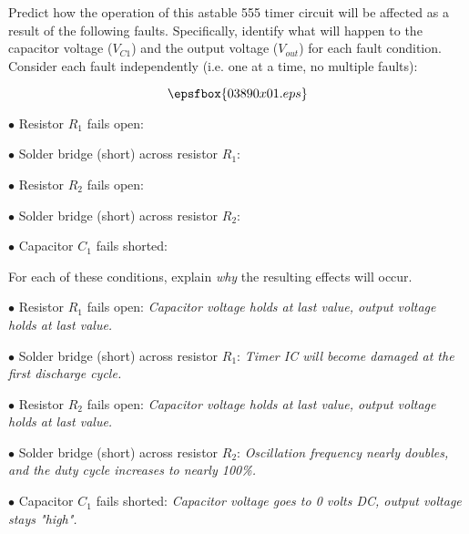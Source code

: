 

Predict how the operation of this astable 555 timer circuit will be affected as a result of the following faults.  Specifically, identify what will happen to the capacitor voltage ($V_{C1}$) and the output voltage ($V_{out}$) for each fault condition.  Consider each fault independently (i.e. one at a time, no multiple faults):

$$\epsfbox{03890x01.eps}$$

\medskip
\item{$\bullet$} Resistor $R_1$ fails open:
\vskip 5pt
\item{$\bullet$} Solder bridge (short) across resistor $R_1$:
\vskip 5pt
\item{$\bullet$} Resistor $R_2$ fails open:
\vskip 5pt
\item{$\bullet$} Solder bridge (short) across resistor $R_2$:
\vskip 5pt
\item{$\bullet$} Capacitor $C_1$ fails shorted:
\medskip

For each of these conditions, explain {\it why} the resulting effects will occur.







\medskip
\item{$\bullet$} Resistor $R_1$ fails open: {\it Capacitor voltage holds at last value, output voltage holds at last value.}
\vskip 5pt
\item{$\bullet$} Solder bridge (short) across resistor $R_1$: {\it Timer IC will become damaged at the first discharge cycle.}
\vskip 5pt
\item{$\bullet$} Resistor $R_2$ fails open: {\it Capacitor voltage holds at last value, output voltage holds at last value.}
\vskip 5pt
\item{$\bullet$} Solder bridge (short) across resistor $R_2$: {\it Oscillation frequency nearly doubles, and the duty cycle increases to nearly 100\%.}
\vskip 5pt
\item{$\bullet$} Capacitor $C_1$ fails shorted: {\it Capacitor voltage goes to 0 volts DC, output voltage stays "high".}
\medskip






